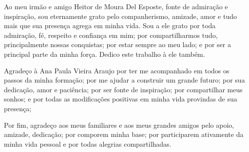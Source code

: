 \begin{agradecimentos}
%

Ao meu irmão e amigo Heitor de Moura Del Esposte, fonte de admiração e inspiração, sou eternamente grato pelo companherismo, amizade, amor e tudo mais que sua presença agrega em minha vida. Sou a ele grato por toda admiração, fé, respeito e confiança em mim; por compartilharmos tudo, principalmente nossas conquistas; por estar sempre ao meu lado; e por ser a principal parte da minha força. Dedico este trabalho à ele também.

%

Agradeço à Ana Paula Vieira Araujo por ter me acompanhado em todos os passos da minha formação; por me ajudar a construir um grande futuro; por sua dedicação, amor e paciência; por ser fonte de inspiração; por compartilhar meus sonhos; e por todas as modificações positivas em minha vida provindas de sua presença;

%

Por fim, agradeço aos meus familiares e aos meus grandes amigos pelo apoio, amizade, dedicação; por comporem minha base; por participarem ativamente da minha vida pessoal e por todas alegrias compartilhadas.

\end{agradecimentos}